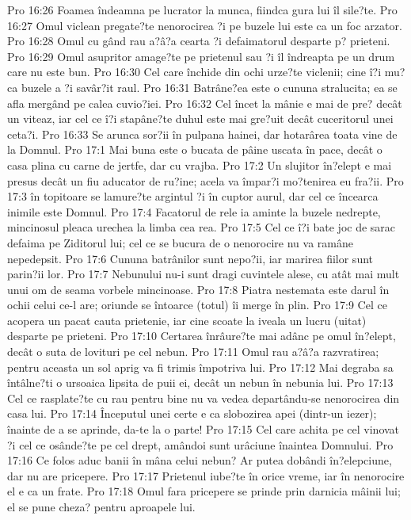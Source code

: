 Pro 16:26  Foamea îndeamna pe lucrator la munca, fiindca gura lui îl sile?te.
Pro 16:27  Omul viclean pregate?te nenorocirea ?i pe buzele lui este ca un foc arzator.
Pro 16:28  Omul cu gând rau a?â?a cearta ?i defaimatorul desparte p? prieteni.
Pro 16:29  Omul asupritor amage?te pe prietenul sau ?i îl îndreapta pe un drum care nu este bun.
Pro 16:30  Cel care închide din ochi urze?te viclenii; cine î?i mu?ca buzele a ?i savâr?it raul.
Pro 16:31  Batrâne?ea este o cununa stralucita; ea se afla mergând pe calea cuvio?iei.
Pro 16:32  Cel încet la mânie e mai de pre? decât un viteaz, iar cel ce î?i stapâne?te duhul este mai gre?uit decât cuceritorul unei ceta?i.
Pro 16:33  Se arunca sor?ii în pulpana hainei, dar hotarârea toata vine de la Domnul.
Pro 17:1  Mai buna este o bucata de pâine uscata în pace, decât o casa plina cu carne de jertfe, dar cu vrajba.
Pro 17:2  Un slujitor în?elept e mai presus decât un fiu aducator de ru?ine; acela va împar?i mo?tenirea eu fra?ii.
Pro 17:3  în topitoare se lamure?te argintul ?i în cuptor aurul, dar cel ce încearca inimile este Domnul.
Pro 17:4  Facatorul de rele ia aminte la buzele nedrepte, mincinosul pleaca urechea la limba cea rea.
Pro 17:5  Cel ce î?i bate joc de sarac defaima pe Ziditorul lui; cel ce se bucura de o nenorocire nu va ramâne nepedepsit.
Pro 17:6  Cununa batrânilor sunt nepo?ii, iar marirea fiilor sunt parin?ii lor.
Pro 17:7  Nebunului nu-i sunt dragi cuvintele alese, cu atât mai mult unui om de seama vorbele mincinoase.
Pro 17:8  Piatra nestemata este darul în ochii celui ce-l are; oriunde se întoarce (totul) îi merge în plin.
Pro 17:9  Cel ce acopera un pacat cauta prietenie, iar cine scoate la iveala un lucru (uitat) desparte pe prieteni.
Pro 17:10  Certarea înrâure?te mai adânc pe omul în?elept, decât o suta de lovituri pe cel nebun.
Pro 17:11  Omul rau a?â?a razvratirea; pentru aceasta un sol aprig va fi trimis împotriva lui.
Pro 17:12  Mai degraba sa întâlne?ti o ursoaica lipsita de puii ei, decât un nebun în nebunia lui.
Pro 17:13  Cel ce rasplate?te cu rau pentru bine nu va vedea departându-se nenorocirea din casa lui.
Pro 17:14  Începutul unei certe e ca slobozirea apei (dintr-un iezer); înainte de a se aprinde, da-te la o parte!
Pro 17:15  Cel care achita pe cel vinovat ?i cel ce osânde?te pe cel drept, amândoi sunt urâciune înaintea Domnului.
Pro 17:16  Ce folos aduc banii în mâna celui nebun? Ar putea dobândi în?elepciune, dar nu are pricepere.
Pro 17:17  Prietenul iube?te în orice vreme, iar în nenorocire el e ca un frate.
Pro 17:18  Omul fara pricepere se prinde prin darnicia mâinii lui; el se pune cheza? pentru aproapele lui.
